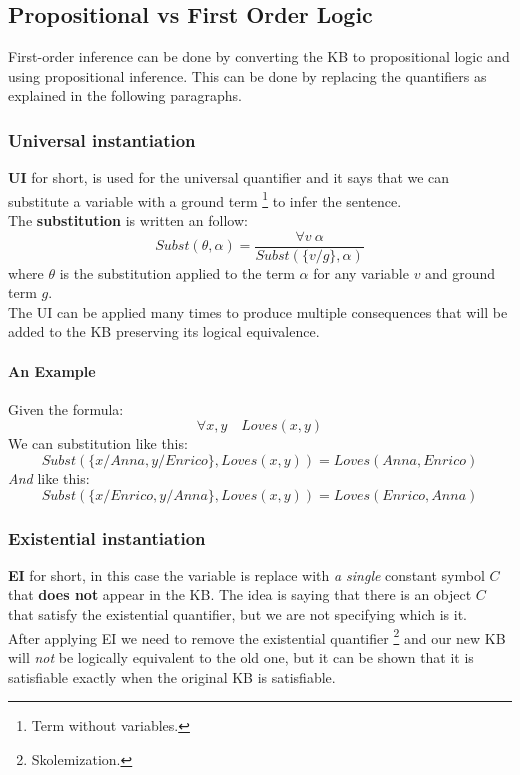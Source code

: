 \documentclass[10pt,a4paper]{article}
\begin{document}
\subsection{Propositional vs First Order Logic}
\label{subsec:prop_vs_fol}

\newcommand{\subst}[1]{Subst(\theta,#1)} 

First-order inference can be done by converting the KB to propositional logic and using propositional inference. This can be done by replacing the quantifiers as explained in the following paragraphs.

\subsubsection{Universal instantiation}
\label{subsubsec:UI}

\textbf{UI} for short, is used for the universal quantifier and it says that we can substitute a variable with a ground term \footnote{Term without variables.} to infer the sentence.\\
The \textbf{substitution} is written an follow:
\[Subst(\theta,\alpha)=\frac{\forall v\ \alpha}{Subst(\lbrace v/g\rbrace,\alpha)}\]
where $\theta$ is the substitution applied to the term $\alpha$ for any variable $v$ and ground term $g$. \\
The UI can be applied many times to produce multiple consequences that will be added to the KB  preserving its logical equivalence.

\paragraph{An Example}
Given the formula:
\[\forall x,y\quad Loves(x,y)\]
We can substitution like this:
\[Subst(\lbrace x/Anna,y/Enrico \rbrace,Loves(x,y))=Loves(Anna,Enrico)\]
\textit{And} like this:
\[Subst(\lbrace x/Enrico,y/Anna \rbrace,Loves(x,y))=Loves(Enrico,Anna)\]

\subsubsection{Existential instantiation}
\label{subsubsec:EI}
\textbf{EI} for short, in this case the variable is replace with \textit{a single} constant symbol $C$ that \textbf{does not} appear in the KB. The idea is saying that there is an object $C$ that satisfy the existential quantifier, but we are not specifying which is it.\\
After applying EI we need to remove the existential quantifier \footnote{Skolemization.} and our new KB will \textit{not} be logically equivalent to the old one, but it can be shown that it is satisfiable exactly when the original KB is satisfiable.
\end{document}
